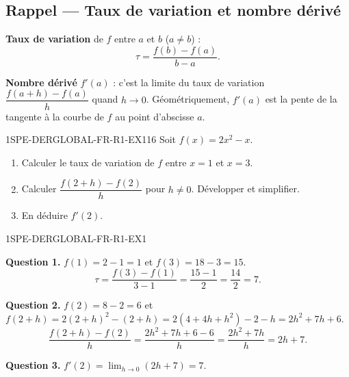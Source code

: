 

\subsection*{Rappel — Taux de variation et nombre dérivé}

\textbf{Taux de variation} de $f$ entre $a$ et $b$ ($a
\neq b$) :
\[
  \tau = \frac{f(b) - f(a)}{b - a}.
\]

\textbf{Nombre dérivé} $f'(a)$ : c'est la limite du taux de variation $\dfrac{f(a+h)-f(a)}{h}$ quand $h \to 0$. Géométriquement, $f'(a)$ est la pente de la tangente à la courbe de $f$ au point d'abscisse $a$.


\begin{exercice}{1SPE-DERGLOBAL-FR-R1-EX1}{1}{6}
Soit $f(x) = 2x^2 - x$.
\begin{enumerate}
  \item Calculer le taux de variation de $f$ entre $x = 1$ et $x = 3$.
  \item Calculer $\dfrac{f(2+h)-f(2)}{h}$ pour $h
\neq 0$. Développer et simplifier.
  \item En déduire $f'(2)$.
\end{enumerate}
\end{exercice}


\begin{corrige}{1SPE-DERGLOBAL-FR-R1-EX1}


\textbf{Question 1.}
$f(1) = 2 - 1 = 1$ et $f(3) = 18 - 3 = 15$.
\[
\tau = \frac{f(3) - f(1)}{3 - 1} = \frac{15 - 1}{2} = \frac{14}{2} = 7.
\]

\textbf{Question 2.}
$f(2) = 8 - 2 = 6$ et $f(2+h) = 2(2+h)^2 - (2+h) = 2(4 + 4h + h^2) - 2 - h = 2h^2 + 7h + 6$.
\[
\frac{f(2+h) - f(2)}{h} = \frac{2h^2 + 7h + 6 - 6}{h} = \frac{2h^2 + 7h}{h} = 2h + 7.
\]


\textbf{Question 3.}
$f'(2) = \lim_{h \to 0}(2h + 7) = 7.$

\end{corrige}

